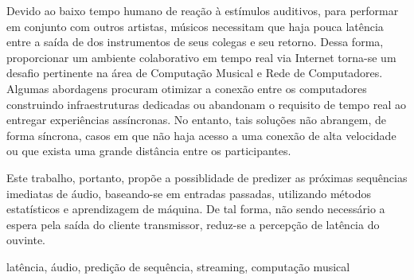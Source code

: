 \resumo
{}
Devido ao baixo tempo humano de reação à estímulos auditivos, para performar em conjunto com outros artistas, músicos necessitam que haja pouca latência entre a saída de dos instrumentos de seus colegas e seu retorno. Dessa forma, proporcionar um ambiente colaborativo em tempo real via Internet torna-se um desafio pertinente na área de Computação Musical e Rede de Computadores. Algumas abordagens procuram otimizar a conexão entre os computadores construindo infraestruturas dedicadas ou abandonam o requisito de tempo real ao entregar experiências assíncronas. No entanto, tais soluções não abrangem, de forma síncrona, casos em que não haja acesso a uma conexão de alta velocidade ou que exista uma grande distância entre os participantes.

Este trabalho, portanto, propõe a possiblidade de predizer as próximas sequências imediatas de áudio, baseando-se em entradas passadas, utilizando métodos estatísticos e aprendizagem de máquina. De tal forma, não sendo necessário a espera pela saída do cliente transmissor, reduz-se a percepção de latência do ouvinte.
\begin{keywords}
latência, áudio, predição de sequência, streaming, computação musical
\end{keywords}
